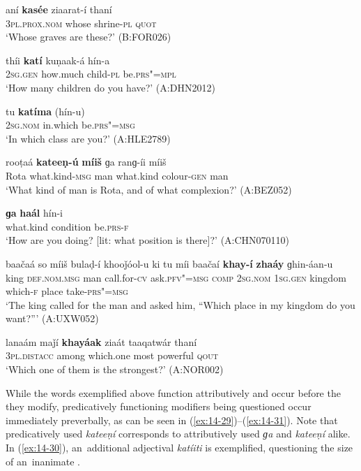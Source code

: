 \begin{exe}
\ex
\label{ex:14-23}
\gll aní \textbf{kasée} ziaarat-í thaní \\
\textsc{3pl.prox.nom} whose shrine-\textsc{pl} \textsc{quot} \\
\glt `Whose graves are these?' (B:FOR026)

\ex
\label{ex:14-24}
\gll thíi \textbf{katí} kuṇaak-á hín-a \\
\textsc{2sg.gen} how.much child-\textsc{pl} be.\textsc{prs"=mpl} \\
\glt `How many children do you have?' (A:DHN2012)

\ex
\label{ex:14-25}
\gll tu \textbf{katíma} (hín-u) \\
\textsc{2sg.nom} in.which be.\textsc{prs"=msg} \\
\glt `In which class are you?' (A:HLE2789)

\ex
\label{ex:14-26}
\gll rooṭaá \textbf{kateeṇ-ú} \textbf{míiš} ɡa ranɡ-íi  míiš \\
Rota what.kind-\textsc{msg} man what.kind colour-\textsc{gen} man  \\
\glt `What kind of man is Rota, and of what complexion?' (A:BEZ052)

\ex
\label{ex:14-27}
\gll \textbf{ɡa} \textbf{haál} hín-i \\
what.kind condition be.\textsc{prs-f} \\
\glt `How are you doing? [lit: what position is there]?' (A:CHN070110)

\ex
\label{ex:14-28}
\gll baačaá so míiš bulaḍ-í khooǰóol-u ki tu míi baačaí \textbf{khay-í} \textbf{zhaáy} ɡhin-áan-u \\
king \textsc{def.nom.msg} man call.for-\textsc{cv} ask.\textsc{pfv"=msg} \textsc{comp} \textsc{2sg.nom} \textsc{1sg.gen} kingdom which-\textsc{f} place take-\textsc{prs"=msg}  \\
\glt `The king called for the man and asked him, ``Which place in my kingdom do you want?''' (A:UXW052)

\ex
\label{ex:14-28b}
\gll lanaám maǰí \textbf{khayáak} ziaát taaqatwár thaní\\
\textsc{3pl.distacc} among which.one most powerful \textsc{qout}\\
\glt `Which one of them is the strongest?' (A:NOR002)
\end{exe}




While the  words exemplified above function attributively and occur before the  they modify, predicatively functioning modifiers being questioned occur immediately preverbally, as can be seen in (\ref{ex:14-29})--(\ref{ex:14-31}). Note that predicatively used \textit{kateeṇí} corresponds to attributively used \textit{ɡa} and \textit{kateeṇí} alike. In (\ref{ex:14-30}), an~additional adjectival  \textit{katíiti} is exemplified, questioning the size of an~inanimate .

